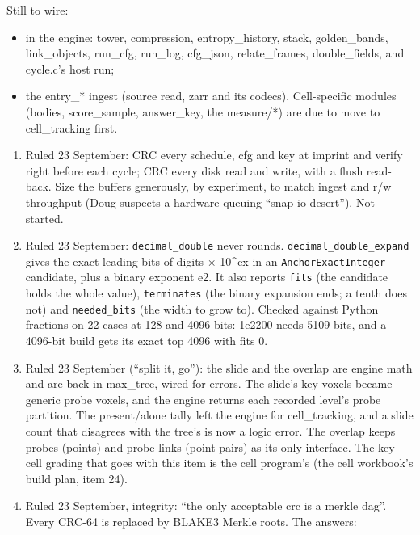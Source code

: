 Still to wire:

\begin{itemize}
\item in the engine: tower, compression, entropy\_\allowbreak{}history, stack, golden\_\allowbreak{}bands, link\_\allowbreak{}objects, run\_\allowbreak{}cfg, run\_\allowbreak{}log, cfg\_\allowbreak{}json, relate\_\allowbreak{}frames, double\_\allowbreak{}fields, and cycle.c's host run;
\item the entry\_\allowbreak{}* ingest (source read, zarr and its codecs). Cell-specific modules (bodies, score\_\allowbreak{}sample, answer\_\allowbreak{}key, the measure/*) are due to move to cell\_\allowbreak{}tracking first.
\end{itemize}

\begin{enumerate}
\item Ruled 23 September: CRC every schedule, cfg and key at imprint and verify right before each cycle; CRC every disk read and write, with a flush read-back. Size the buffers generously, by experiment, to match ingest and r/w throughput (Doug suspects a hardware queuing “snap io desert”). Not started.
\item Ruled 23 September: \texttt{decimal\_\allowbreak{}double} never rounds. \texttt{decimal\_\allowbreak{}double\_\allowbreak{}expand} gives the exact leading bits of digits × 10\textasciicircum{}ex in an \texttt{Anchor\allowbreak{}Exact\allowbreak{}Integer} candidate, plus a binary exponent e2. It also reports \texttt{fits} (the candidate holds the whole value), \texttt{terminates} (the binary expansion ends; a tenth does not) and \texttt{needed\_\allowbreak{}bits} (the width to grow to). Checked against Python fractions on 22 cases at 128 and 4096 bits: 1e2200 needs 5109 bits, and a 4096-bit build gets its exact top 4096 with fits 0.
\item Ruled 23 September (“split it, go”): the slide and the overlap are engine math and are back in max\_\allowbreak{}tree, wired for errors. The slide's key voxels became generic probe voxels, and the engine returns each recorded level's probe partition. The present/alone tally left the engine for cell\_\allowbreak{}tracking, and a slide count that disagrees with the tree's is now a logic error. The overlap keeps probes (points) and probe links (point pairs) as its only interface. The key-cell grading that goes with this item is the cell program's (the cell workbook's build plan, item 24).
\item Ruled 23 September, integrity: “the only acceptable crc is a merkle dag”. Every CRC-64 is replaced by BLAKE3 Merkle roots. The answers:
\end{enumerate}

